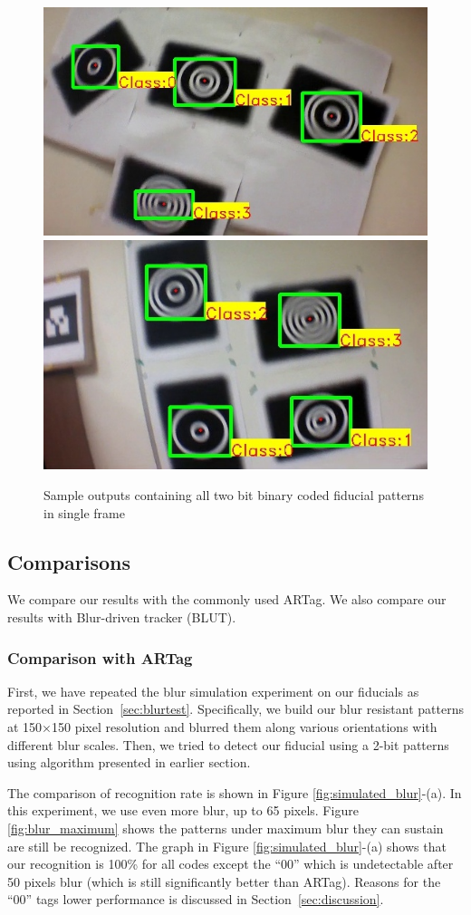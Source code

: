 \documentclass[10pt,twocolumn,letterpaper]{article}
\begin{document}
\begin{figure}[ht!]
\centering
  \includegraphics[width=.45\linewidth]{output_all_2.jpg}
  \includegraphics[width=.45\linewidth]{new_results/output_test_all1.jpg}
  \caption{Sample outputs containing all two bit binary coded fiducial patterns
  in single frame}
  \label{fig:output_all}
\end{figure}

\subsection{Comparisons}

We compare our results with the commonly used ARTag. We also compare
our results with Blur-driven tracker (BLUT)\cite{Wu:2011}.
\subsubsection{Comparison with ARTag}
First, we have repeated the blur simulation experiment on our fiducials as reported
in Section~\ref{sec:blurtest}.  Specifically, we build our blur resistant
patterns at 150$\times$150 pixel resolution and blurred them along various
orientations with different blur scales. Then, we tried to detect our fiducial using a 2-bit
patterns using algorithm presented in earlier section.

The comparison of recognition rate is shown in Figure
\ref{fig:simulated_blur}-(a). In this experiment, we use even more blur, up to 65
pixels. Figure \ref{fig:blur_maximum} shows the patterns under maximum blur they
can sustain are still be recognized. The graph in Figure
\ref{fig:simulated_blur}-(a) shows that our recognition is 100\% for all codes
except the ``00'' which is undetectable after 50 pixels blur (which is still
significantly better than ARTag).  Reasons for the ``00'' tags lower
performance is discussed in Section~\ref{sec:discussion}.
\end{document}
